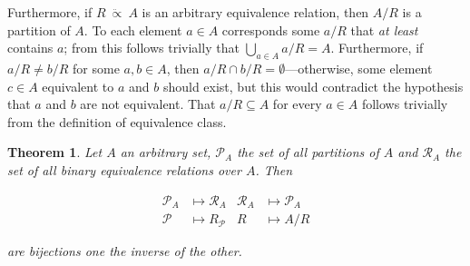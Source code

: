 \documentclass[a4paper, 12pt]{article}
\newtheorem{theorem}{Theorem}
\newtheorem{theorem}{Theorem}
\begin{document}
Furthermore, if $R ~ \ddot{\propto} ~A$ is an arbitrary equivalence relation, then $A
/ R$ is a partition of $A$. To each element $a \in A$ corresponds some $a / R$
that \textit{at least} contains $a$; from this follows trivially that
$\bigcup_{a \in A} a / R = A$. Furthermore, if $a / R \neq b / R$ for some $a, b
\in  A$, then $a / R \cap b / R = \emptyset$---otherwise, some element $c \in A$
equivalent to $a$ and $b$ should exist, but this would contradict the hypothesis
that $a$ and $b$ are not equivalent. That $a / R \subseteq A$ for every $a \in
A$ follows trivially from the definition of equivalence class.

\begin{theorem}
    Let $A$ an arbitrary set, $\mathscr{P}_A$ the set of all partitions of $A$
    and $\mathscr{R}_A$ the set of all binary equivalence relations over $A$.
    Then 

    \begin{align*}
        \mathscr{P}_A &\mapsto \mathscr{R}_A &\mathscr{R}_A  &\mapsto \mathscr{P}_A \\ 
        \mathcal{P} &\mapsto R_{\mathcal{P}} & R &\mapsto A / R
    \end{align*}


    are bijections one the inverse of the other.
\end{theorem}
\end{document}
